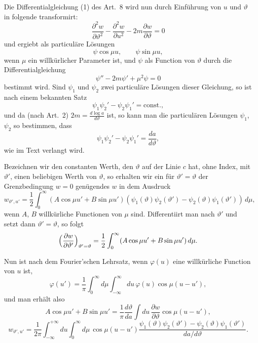 \documentclass[12pt,a4paper]{book}
\theoremstyle{definition}
\theoremstyle{remark}
\begin{document}
Die Differentialgleichung (1) des Art.~8 wird nun durch Einf\"uhrung von $u$ und $\vartheta$ in folgende transformirt:
\begin{equation*}
\frac{\partial^{2}w}{\partial\vartheta^{2}} - \frac{\partial^{2}w}{\partial u^{2}} - 2m\frac{\partial w}{\partial\vartheta} = 0\tag{1}
\end{equation*}
und ergiebt als particul\"are L\"osungen
\[
\psi\cos\mu u,\qquad \psi\sin\mu u,
\]
wenn $\mu$ ein willk\"urlicher Parameter ist, und $\psi$ als Function von $\vartheta$ durch die Differentialgleichung
\begin{equation*}
\psi'' - 2m\psi' + \mu^{2}\psi = 0\tag{2}
\end{equation*}
bestimmt wird. Sind $\psi_{1}$ und $\psi_{2}$ zwei particul\"are L\"osungen dieser Gleichung, so ist nach einem bekannten Satz
\[
\psi_{1}\psi_{2}' - \psi_{2}\psi_{1}' = \text{const.},
\]
und da (nach Art.~2) $2m = \frac{d\log a}{d\vartheta}$ ist, so kann man die particul\"aren L\"osungen $\psi_{1}$, $\psi_{2}$ so bestimmen, dass
\[
\psi_{1}\psi_{2}' - \psi_{2}\psi_{1}' = \frac{da}{d\vartheta},
\]
wie im Text verlangt wird.

Bezeichnen wir den constanten Werth, den $\vartheta$ auf der Linie $c$ hat, ohne Index, mit $\vartheta'$, einen beliebigen Werth von $\vartheta$, so erhalten wir ein f\"ur $\vartheta' = \vartheta$ der Grenzbedingung $w = 0$ gen\"ugendes $w$ in dem Ausdruck
\begin{equation*}
w_{\vartheta',u'} = \frac{1}{2}\int_{0}^{\infty}(A\cos\mu u' + B\sin\mu u')(\psi_{1}(\vartheta)\psi_{2}(\vartheta') - \psi_{2}(\vartheta)\psi_{1}(\vartheta'))\,d\mu,\tag{4}
\end{equation*}
wenn $A$, $B$ willk\"urliche Functionen von $\mu$ sind. Differentiirt man nach $\vartheta'$ und setzt dann $\vartheta' = \vartheta$, so folgt
\[
\Bigl(\frac{\partial w}{\partial\vartheta'}\Bigr)_{\vartheta'=\vartheta} = \frac{1}{2}\int_{0}^{\infty}(A\cos\mu u' + B\sin\mu u')\,d\mu.
\]

Nun ist nach dem Fourier'schen Lehrsatz, wenn $\varphi(u)$ eine willk\"urliche Function von $u$ ist,
\[
\varphi(u') = \frac{1}{\pi}\int_{0}^{\infty}d\mu\int_{-\infty}^{\infty}du\,\varphi(u)\cos\mu(u - u'),
\]
und man erh\"alt also
\[
A\cos\mu u' + B\sin\mu u' = \frac{1}{\pi}\frac{d\vartheta}{da}\int du\,\frac{\partial w}{\partial\vartheta}\cos\mu(u - u'),
\]
\[
w_{\vartheta',u'} = \frac{1}{2\pi}\int_{-\infty}^{+\infty}du\int_{0}^{\infty}d\mu\,\cos\mu(u - u')\frac{\psi_{1}(\vartheta)\psi_{2}(\vartheta') - \psi_{2}(\vartheta)\psi_{1}(\vartheta')}{da/d\vartheta}.
\]
\end{document}
